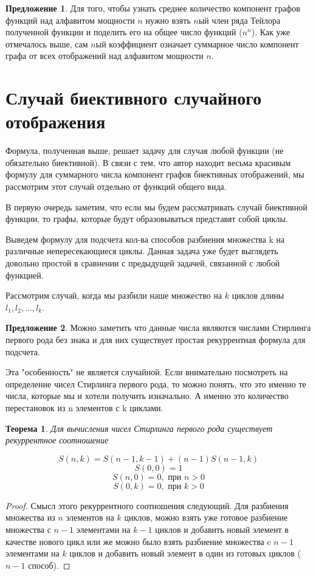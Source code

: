 \documentclass[10pt, a4paper]{report}
\newtheorem{theorem}{Теорема}[chapter]
\theoremstyle{definition}
\newtheorem{remark}{Предложение}[chapter]
\begin{document}
\begin{remark}
	Для того, чтобы узнать среднее количество компонент графов функций над алфавитом мощности $n$ нужно взять $n$ый член ряда Тейлора полученной функции и поделить его на общее число функций ($n^n$). Как уже отмечалось выше, сам $n$ый коэффициент означает суммарное число компонент графа от всех отображений над алфавитом мощности $n$.
\end{remark}

\section{Случай биективного случайного отображения}

Формула, полученная выше, решает задачу для случая любой функции (не обязательно биективной). В связи с тем, что автор находит весьма красивым формулу для суммарного числа компонент графов биективных отображений, мы рассмотрим этот случай отдельно от функций общего вида.

В первую очередь заметим, что если мы будем рассматривать случай биективной функции, то графы, которые будут образовываться представят собой циклы.

Выведем формулу для подсчета кол-ва способов разбиения множества k на различные непересекающиеся циклы. Данная задача уже будет выглядеть довольно простой в сравнении с предыдущей задачей, связанной с любой функцией. 

Рассмотрим случай, когда мы разбили наше множество на $k$ циклов длины $l_1, l_2, ..., l_k$. 

\begin{remark}
Можно заметить что данные числа являются числами Стирлинга первого рода без знака и для них существует простая рекуррентная формула для подсчета.
\end{remark}

Эта "особенность" не является случайной. Если внимательно посмотреть на определение чисел Стирлинга первого рода, то можно понять, что это именно те числа, которые мы и хотели получить изначально. А именно это количество перестановок из n элементов с k циклами.

\begin{theorem}
Для вычисления чисел Стирлинга первого рода существует рекуррентное соотношение 

$$S(n, k) = S(n-1, k-1) + (n-1) S(n-1,k)$$
$$S(0,0) = 1$$
$$S(n,0) = 0, \text{ при } n>0$$
$$S(0,k) = 0, \text{ при } k>0$$
\end{theorem}
\begin{proof}
Смысл этого рекуррентного соотношения следующий. Для разбиения множества из $n$ элементов на $k$ циклов, можно взять уже готовое разбиение множества с $n-1$ элементами на $k-1$ циклов и добавить новый элемент в качестве нового цикл или же можно было взять разбиение множества c $n-1$ элементами на $k$ циклов и добавить новый элемент в один из готовых циклов ($n-1$ способ). 
\end{proof}
\end{document}
